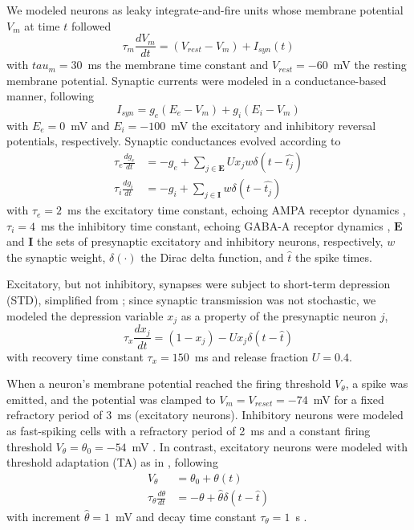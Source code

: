\documentclass[pdflatex,referee,iicol,sn-basic]{sn-jnl}
\theoremstyle{thmstyleone}%
\theoremstyle{thmstyletwo}%
\theoremstyle{thmstylethree}%
\begin{document}
We modeled neurons as leaky integrate-and-fire units whose membrane potential $V_m$ at time $t$ followed
\begin{equation}
    \tau_m \frac{dV_m}{dt} = (V_{rest}-V_m) + I_{syn}(t)
\end{equation}
with $tau_m = 30$~ms the membrane time constant and $V_{rest} = -60$~mV the resting membrane potential. Synaptic currents were modeled in a conductance-based manner, following
\begin{equation}
    I_{syn} = g_e(E_e-V_m) + g_i(E_i-V_m)
\end{equation}
with $E_e = 0$~mV and $E_i = -100$~mV the excitatory and inhibitory reversal potentials, respectively. Synaptic conductances evolved according to
\begin{align} 
    \tau_e \frac{dg_e}{dt} &= -g_e + \sum_{j \in \boldsymbol E} U x_j w \delta(t - \hat{t_j}) \nonumber \\
    \tau_i \frac{dg_i}{dt} &= -g_i + \sum_{j \in \boldsymbol I} w \delta(t - \hat{t_j}) \label{eqn-gsyn}
\end{align}
with $\tau_e = 2$~ms the excitatory time constant, echoing AMPA receptor dynamics \citep{Hausser1997-cn}, $\tau_i = 4$~ms the inhibitory time constant, echoing GABA-A receptor dynamics \citep{Destexhe1994-oc}, $\boldsymbol E$ and $\boldsymbol I$ the sets of presynaptic excitatory and inhibitory neurons, respectively, $w$ the synaptic weight, $\delta(\cdot)$ the Dirac delta function, and $\hat{t}$ the spike times.

Excitatory, but not inhibitory, synapses were subject to short-term depression (STD), simplified from \cite{Tsodyks1997-qt}; since synaptic transmission was not stochastic, we modeled the depression variable $x_j$ as a property of the presynaptic neuron $j$,
\begin{equation}
    \tau_x \frac{dx_j}{dt} = (1-x_j) - U x_j \delta(t - \hat{t}) \label{eqn-xsyn}
\end{equation}
with recovery time constant $\tau_x = 150$~ms and release fraction $U = 0.4$.

When a neuron's membrane potential reached the firing threshold $V_\theta$, a spike was emitted, and the potential was clamped to $V_m = V_{reset} = -74$~mV for a fixed refractory period of 3~ms (excitatory neurons). Inhibitory neurons were modeled as fast-spiking cells with a refractory period of 2~ms and a constant firing threshold $V_\theta = \theta_0 = -54$~mV \citep{Mensi2012-au}. In contrast, excitatory neurons were modeled with threshold adaptation (TA) as in \cite{Teeter2018-iz}, following
\begin{align}
    V_\theta &= \theta_0 + \theta(t) \nonumber \\
    \tau_{\theta} \frac{d\theta}{dt} &= -\theta + \hat{\theta} \delta(t - \hat{t}) \label{eqn-TA}
\end{align}
with increment $\hat{\theta} = 1$~mV and decay time constant $\tau_{\theta} = 1$~s \citep{Pozzorini2015-ei}.
\end{document}
